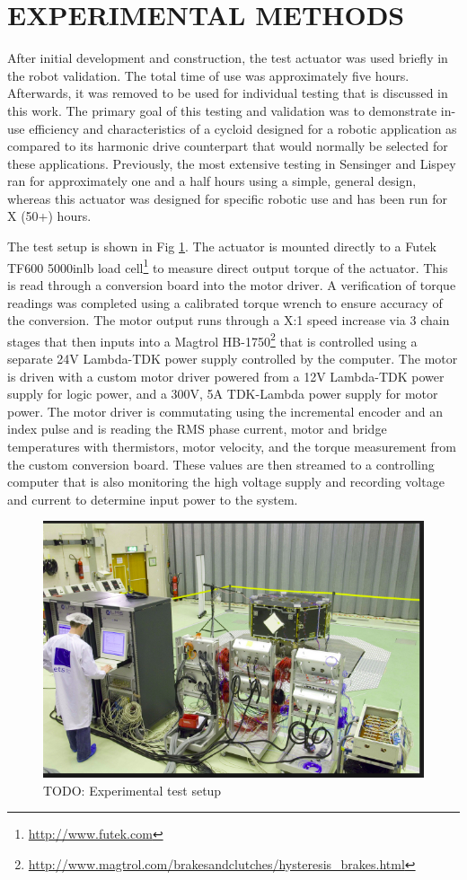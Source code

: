 \documentclass[letterpaper, 10 pt, conference]{ieeeconf}  %
\begin{document}
\section{EXPERIMENTAL METHODS}\label{methods}

After initial development and construction, the test actuator was used briefly in the robot validation. The total time of use was approximately five hours. Afterwards, it was removed to be used for individual testing that is discussed in this work. The primary goal of this testing and validation was to demonstrate in-use efficiency and characteristics of a cycloid designed for a robotic application as compared to its harmonic drive counterpart that would normally be selected for these applications. Previously, the most extensive testing in Sensinger and Lispey ran for approximately one and a half hours \cite{unified_approach} using a simple, general design, whereas this actuator was designed for specific robotic use and has been run for X (50+) hours. 

The test setup is shown in Fig \ref{test_setup}. The actuator is mounted directly to a Futek TF600 5000inlb load cell\footnote{\url{http://www.futek.com}} to measure direct output torque of the actuator. This is read through a conversion board into the motor driver. A verification of torque readings was completed using a calibrated torque wrench to ensure accuracy of the conversion. The motor output runs through a X:1 speed increase via 3 chain stages that then inputs into a Magtrol HB-1750\footnote{\url{http://www.magtrol.com/brakesandclutches/hysteresis_brakes.html}} that is controlled using a separate 24V Lambda-TDK power supply controlled by the computer. The motor is driven with a custom motor driver powered from a 12V Lambda-TDK power supply for logic power, and a 300V, 5A TDK-Lambda power supply for motor power. The motor driver is commutating using the incremental encoder and an index pulse and is reading the RMS phase current, motor and bridge temperatures with thermistors, motor velocity, and the torque measurement from the custom conversion board. These values are then streamed to a controlling computer that is also monitoring the high voltage supply and recording voltage and current to determine input power to the system. 

   \begin{figure}[t]
      \centering
      \includegraphics[width=0.75\linewidth]{test_setup_standin}
      \caption{TODO: Experimental test setup}
      \label{test_setup}
   \end{figure}
\end{document}
